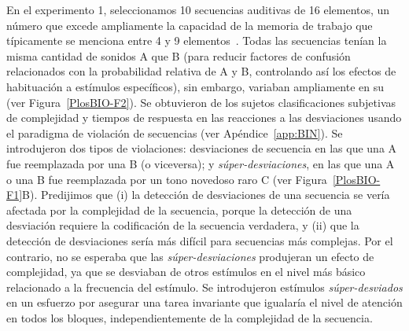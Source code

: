 En el experimento 1, seleccionamos 10 secuencias auditivas de 16 elementos, un número que excede ampliamente la capacidad de la memoria de trabajo que típicamente se menciona entre 4 y 9 elementos~\cite{f25,f29,f86}. Todas las secuencias tenían la misma cantidad de sonidos A que B (para reducir factores de confusión relacionados con la probabilidad relativa de A y B, controlando así los efectos de habituación a estímulos específicos), sin embargo, variaban ampliamente en su \mdlbin (ver Figura~\ref{PlosBIO-F2}). Se obtuvieron de los sujetos clasificaciones subjetivas de complejidad y tiempos de respuesta en las reacciones a las desviaciones usando el paradigma de violación de secuencias (ver Apéndice~\ref{app:BIN}). Se introdujeron dos tipos de violaciones: desviaciones de secuencia en las que una A fue reemplazada por una B (o viceversa); y \textit{súper-desviaciones}, en las que una A o una B fue reemplazada por un tono novedoso raro C (ver Figura~\ref{PlosBIO-F1}B). Predijimos que (i) la detección de desviaciones de una secuencia se vería afectada por la complejidad de la secuencia, porque la detección de una desviación requiere la codificación de la secuencia verdadera, y (ii) que la detección de desviaciones sería más difícil para secuencias más complejas. Por el contrario, no se esperaba que las \textit{súper-desviaciones} produjeran un efecto de complejidad, ya que se desviaban de otros estímulos en el nivel más básico relacionado a la frecuencia del estímulo. Se introdujeron estímulos \textit{súper-desviados} en un esfuerzo por asegurar una tarea invariante que igualaría el nivel de atención en todos los bloques, independientemente de la complejidad de la secuencia. 

